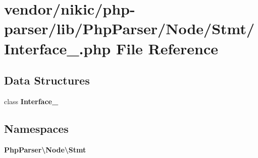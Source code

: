 \section{vendor/nikic/php-\/parser/lib/\+Php\+Parser/\+Node/\+Stmt/\+Interface\+\_\+.php File Reference}
\label{_node_2_stmt_2_interface___8php}
\subsection*{Data Structures}
\begin{DoxyCompactItemize}
\item 
class {\bf Interface\+\_\+}
\end{DoxyCompactItemize}
\subsection*{Namespaces}
\begin{DoxyCompactItemize}
\item 
 {\bf Php\+Parser\textbackslash{}\+Node\textbackslash{}\+Stmt}
\end{DoxyCompactItemize}
